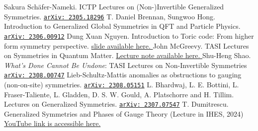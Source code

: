\documentclass{ltjsarticle}
\theoremstyle{mystyle} %
\numberwithin{equation}{section}
\begin{document}
\begin{thebibliography}{99}
     Sakura Sch\"afer-Nameki. 
    ICTP Lectures on (Non-)Invertible Generalized Symmetries. \href{https://arxiv.org/abs/2305.18296}{\texttt{arXiv: 2305.18296}}
     T. Daniel Brennan, Sungwoo Hong. 
    Introduction to Generalized Global Symmetries in QFT and Particle Physics. \href{https://arxiv.org/abs/2306.00912}{\texttt{arXiv: 2306.00912}}
     Dung Xuan Nguyen.  
    Introduction to Toric code: From higher form symmetry perspective. \href{https://pcs.ibs.re.kr/PCS_Workshops/PCS_Asian_Network_School_&_Workshop_Talks_2023_files/Dung_Xuan_Nguyen.pdf}{slide available here. }
    John McGreevy. TASI Lectures on Symmetries in Quantum Matter. 
    \href{https://mcgreevy.physics.ucsd.edu/talks/2023-TASI-lectures.pdf}{Lecture note available here. }
     Shu-Heng Shao. 
    \textit{What's Done Cannot Be Undone}: TASI Lectures on Non-Invertible Symmetries
    \href{https://arxiv.org/pdf/2308.00747}{\texttt{arXiv: 2308.00747}}
     Lieb-Schultz-Mattis anomalies as obstructions to
    gauging (non-on-site) symmetries. 
    \href{https://arxiv.org/pdf/2308.05151}{\texttt{arXiv: 2308.05151}}
     L. Bhardwaj, L. E. Bottini, L. Fraser-Taliente, L. Gladden, D. S. W. Gould, A. Platschorre and H. Tillim. 
    Lectures on Generalized Symmetries. \href{https://arxiv.org/pdf/2307.07547}{\texttt{arXiv: 2307.07547}}
     T. Dumitrescu. Generalized Symmetries and Phases of Gauge Theory 
    (Lecture in IHES, 2024) \href{https://www.youtube.com/watch?v=9pqtqyGtt3M&t=3760s}{YouTube link is accessible here. }
\end{thebibliography}
\end{document}
